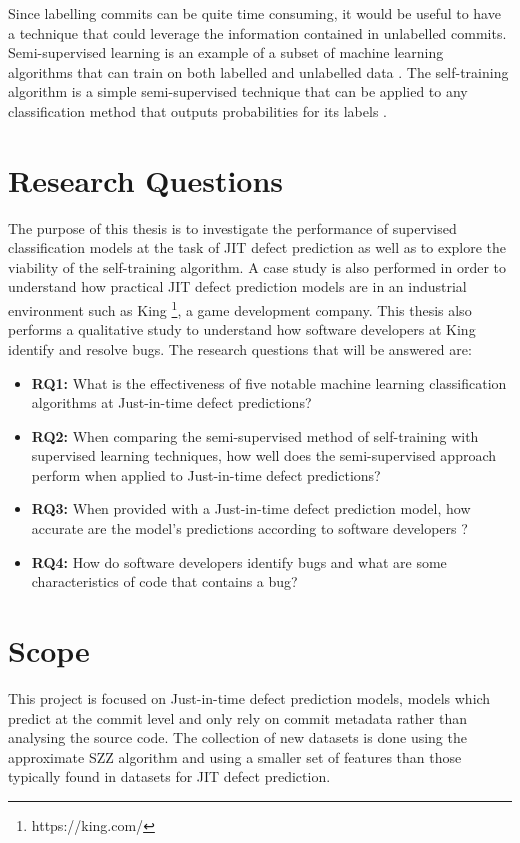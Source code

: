 \documentclass[../main.tex]{subfiles}
\begin{document}
Since labelling commits can be quite time consuming, it would be useful to have a technique that could leverage the information contained in unlabelled commits. Semi-supervised learning is an example of a subset of machine learning algorithms that can train on both labelled and unlabelled data \cite{zhu2005semi}. The self-training algorithm is a simple semi-supervised technique that can be applied to any classification method that outputs probabilities for its labels \cite{zhu2007semi}. 

\section{Research Questions}

The purpose of this thesis is to investigate the performance of supervised classification models at the task of JIT defect prediction as well as to explore the viability of the self-training algorithm. A case study is also performed in order to understand how practical JIT defect prediction models are in an industrial environment such as King \footnote{https://king.com/}, a game development company. This thesis also performs a qualitative study to understand how software developers at King identify and resolve bugs. The research questions that will be answered are:

\begin{itemize}
  \item \textbf{RQ1:} What is the effectiveness of five notable machine learning classification algorithms at Just-in-time defect predictions?
  \item \textbf{RQ2:} When comparing the semi-supervised method of self-training with supervised learning techniques, how well does the semi-supervised approach perform when applied to Just-in-time defect predictions?
   \item \textbf{RQ3:} When provided with a Just-in-time defect prediction model, how accurate are the model's predictions according to software developers ? 
  \item \textbf{RQ4:} How do software developers identify bugs and what are some characteristics of code that contains a bug?
\end{itemize}

\section{Scope}

This project is focused on Just-in-time defect prediction models, models which predict at the commit level and only rely on commit metadata rather than analysing the source code. The collection of new datasets is done using the approximate SZZ algorithm and using a smaller set of features than those typically found in datasets for JIT defect prediction. 
\end{document}
